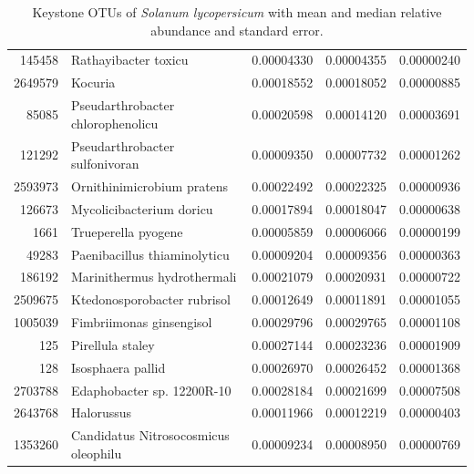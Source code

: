 \documentclass{article}
\begin{document}
\begin{table}[ht]
\begin{tabular}{rlrrr}
  145458 & Rathayibacter toxicu & 0.00004330 & 0.00004355 & 0.00000240 \\ 
  2649579 & Kocuria & 0.00018552 & 0.00018052 & 0.00000885 \\ 
  85085 & Pseudarthrobacter chlorophenolicu & 0.00020598 & 0.00014120 & 0.00003691 \\ 
  121292 & Pseudarthrobacter sulfonivoran & 0.00009350 & 0.00007732 & 0.00001262 \\ 
  2593973 & Ornithinimicrobium pratens & 0.00022492 & 0.00022325 & 0.00000936 \\ 
  126673 & Mycolicibacterium doricu & 0.00017894 & 0.00018047 & 0.00000638 \\ 
  1661 & Trueperella pyogene & 0.00005859 & 0.00006066 & 0.00000199 \\ 
  49283 & Paenibacillus thiaminolyticu & 0.00009204 & 0.00009356 & 0.00000363 \\ 
  186192 & Marinithermus hydrothermali & 0.00021079 & 0.00020931 & 0.00000722 \\ 
  2509675 & Ktedonosporobacter rubrisol & 0.00012649 & 0.00011891 & 0.00001055 \\ 
  1005039 & Fimbriimonas ginsengisol & 0.00029796 & 0.00029765 & 0.00001108 \\ 
  125 & Pirellula staley & 0.00027144 & 0.00023236 & 0.00001909 \\ 
  128 & Isosphaera pallid & 0.00026970 & 0.00026452 & 0.00001368 \\ 
  2703788 & Edaphobacter sp. 12200R-10 & 0.00028184 & 0.00021699 & 0.00007508 \\ 
  2643768 & Halorussus  & 0.00011966 & 0.00012219 & 0.00000403 \\ 
  1353260 & Candidatus Nitrosocosmicus oleophilu & 0.00009234 & 0.00008950 & 0.00000769 \\ 
   \hline
\end{tabular}
\caption{Keystone OTUs of \textit{Solanum lycopersicum} with mean and median relative abundance and standard error.}
\label{tabla_tomate}
\end{table}
\end{document}
